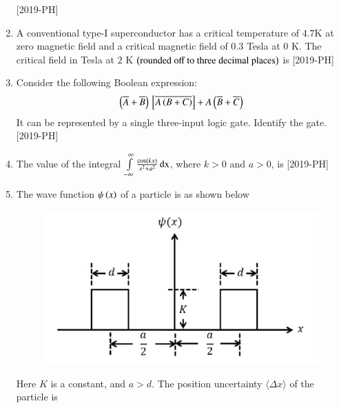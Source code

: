 \documentclass[journal]{IEEEtran}
\begin{document}
\begin{enumerate}[start=27]
    \hfill{[2019-PH]}\\
\item A conventional type-I superconductor has a critical temperature of $4.7$K at zero magnetic field and a critical magnetic field of $0.3$ Tesla at $0$ K. The critical field in Tesla at $2$ K
$\left(\text{rounded off to three decimal places}\right)$ is \underline{\hspace{1cm}} \hfill{[2019-PH]}\\
\item Consider the following Boolean expression:\\
\begin{align*}
    \left(\overline{A}+\overline{B}\right) {}\left[\overline{A \left(B+C\right)}\right] + A\left(\overline{B}+\overline{C}\right)
\end{align*}
It can be represented by a single three-input logic gate. Identify the gate. \hfill{[2019-PH]}\\
\begin{enumerate}
\end{enumerate}
\item The value of the integral $\int \limits_{-\infty}^{\infty} \frac{\cos \left(kx\right)}{x^2+a^2}\, \text{dx}$, where $k>0$ and $a>0$, is \hfill{[2019-PH]}\\
\begin{enumerate}
\end{enumerate}
\item The wave function $\psi\left(x\right)$ of a particle is as shown below\\
\begin{figure}[H]
    \centering
    \includegraphics[width=0.5\linewidth]{figs/Figure_1.png}
    \label{fig:enter-label}
\end{figure}
Here $K$ is a constant, and $a>d$. The position uncertainty $\langle \Delta x \rangle$ of the particle is 


\end{enumerate}
\end{document}
